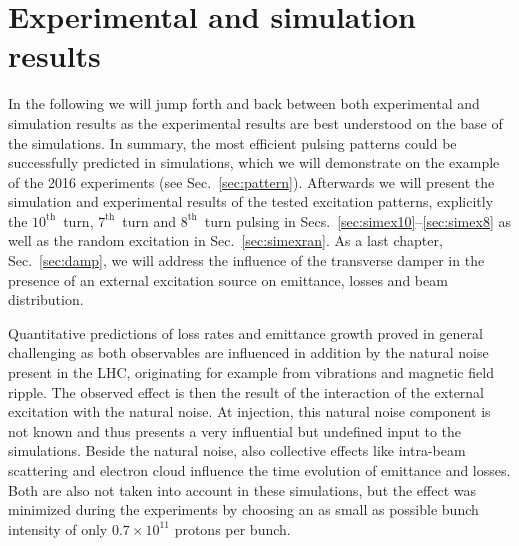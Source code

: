 \documentclass[%
 reprint,
 amsmath,amssymb,
 aps,
prstab,
longbibliography,
]{revtex4-1}
\begin{document}
\section{Experimental and simulation results\label{sec:simex}}
In the following we will jump forth and back between both experimental and simulation results as the experimental results are best understood on the base of the simulations. In summary, the most efficient pulsing patterns could be successfully predicted in simulations, which we will demonstrate on the example of the 2016 experiments (see Sec.~\ref{sec:pattern}). Afterwards we will present the simulation and experimental results of the tested excitation patterns, explicitly the $10^{\mathrm{th}}$~turn, $7^{\mathrm{th}}$~turn and $8^{\mathrm{th}}$~turn pulsing in Secs.~\ref{sec:simex10}--\ref{sec:simex8} as well as the random excitation in Sec.~\ref{sec:simexran}. As a last chapter, Sec.~\ref{sec:damp}, we will address the influence of the transverse damper in the presence of an external excitation source on emittance, losses and beam distribution.

Quantitative predictions of loss rates and emittance growth proved in general challenging as both observables are influenced in addition by the natural noise present in the LHC, originating for example from vibrations and magnetic field ripple. The observed effect is then the result of the interaction of the external excitation with the natural noise. At injection, this natural noise component is not known and thus presents a very influential but undefined input to the simulations. Beside the natural noise, also collective effects like intra-beam scattering and electron cloud influence the time evolution of emittance and losses. Both are also not taken into account in these simulations, but the effect was minimized during the experiments by choosing an as small as possible bunch intensity of only $0.7\times10^{11}$ protons per bunch.
\end{document}
